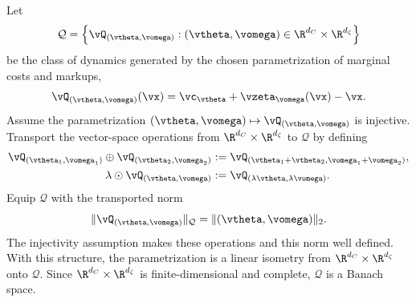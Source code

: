 Let
\[
\mathcal{Q}
=\left\{\vQ_{(\vtheta,\vomega)}:(\vtheta,\vomega)\in
\R^{d_C}\times\R^{d_\zeta}\right\}
\]
be the class of dynamics generated by the chosen parametrization of marginal costs and markups,
\[
\vQ_{(\vtheta,\vomega)}(\vx)
=\vc_{\vtheta}+\vzeta_{\vomega}(\vx)-\vx.
\]
Assume the parametrization $(\vtheta,\vomega)\mapsto \vQ_{(\vtheta,\vomega)}$ is injective. Transport the vector-space operations from $\R^{d_C}\times\R^{d_\zeta}$ to $\mathcal{Q}$ by defining
\[
\begin{aligned}
\vQ_{(\vtheta_1,\vomega_1)}\oplus \vQ_{(\vtheta_2,\vomega_2)}
&:=\vQ_{(\vtheta_1+\vtheta_2,\vomega_1+\vomega_2)},\\
\lambda\odot \vQ_{(\vtheta,\vomega)}
&:=\vQ_{(\lambda\vtheta,\lambda\vomega)}.
\end{aligned}
\]
Equip $\mathcal{Q}$ with the transported norm
\[
\|\vQ_{(\vtheta,\vomega)}\|_{\mathcal Q}
=\|(\vtheta,\vomega)\|_2.
\]
The injectivity assumption makes these operations and this norm well defined. With this structure, the parametrization is a linear isometry from $\R^{d_C}\times\R^{d_\zeta}$ onto $\mathcal{Q}$. Since $\R^{d_C}\times\R^{d_\zeta}$ is finite-dimensional and complete, $\mathcal{Q}$ is a Banach space.
